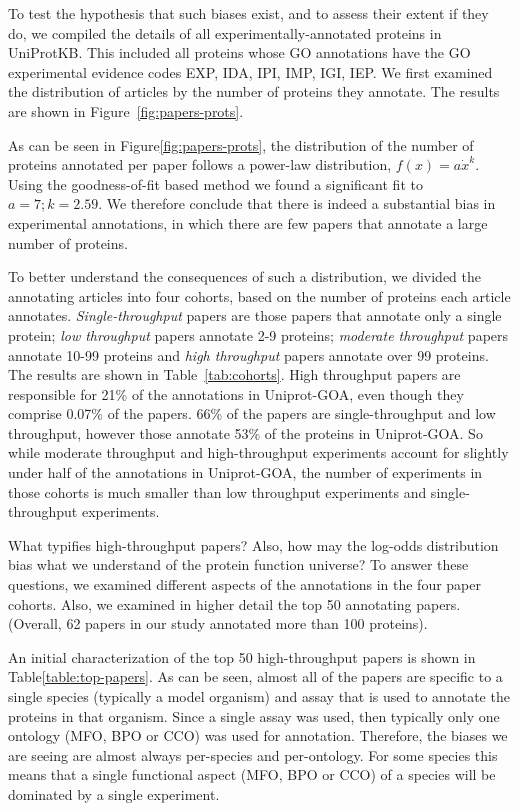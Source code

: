 \documentclass[10pt]{article}
\begin{document}
To test the hypothesis that such biases exist, and to assess their extent if they
do, we compiled the details of all experimentally-annotated
proteins in UniProtKB. This included all proteins whose GO annotations have
the GO experimental evidence codes EXP, IDA, IPI, IMP, IGI, IEP. We first examined
the distribution of articles by the number of proteins they annotate. The results
are shown in Figure~\ref{fig:papers-prots}. 

As can be seen in Figure\ref{fig:papers-prots}, the distribution of the number of proteins
annotated per paper follows a power-law distribution, $f(x)=a\dot x^k$. 
Using the goodness-of-fit based
method we found a significant fit to $a=7; k=2.59$. 
We therefore conclude that there is indeed a substantial bias in
experimental annotations, in which there are few papers that annotate a large
number of proteins.

To better understand the consequences of such a distribution, we divided the annotating
articles into four cohorts, based on the number of proteins each article annotates.
\textit{Single-throughput} papers are those papers that annotate only a single protein;
\textit{low throughput} papers annotate 2-9 proteins; \textit{moderate throughput} papers
annotate 10-99 proteins and \textit{high throughput} papers annotate over 99 proteins. The
results are shown in Table~\ref{tab:cohorts}. High throughput papers are responsible for
21\% of the annotations in Uniprot-GOA, even though they comprise 0.07\% of the papers. 66\%
of the papers are single-throughput and low throughput, however those annotate 53\% of the
proteins in Uniprot-GOA. So while moderate throughput and high-throughput experiments
account for slightly under half of the annotations in Uniprot-GOA, the number of experiments
in those cohorts is much smaller than low throughput experiments and single-throughput
experiments. 

What typifies high-throughput papers? Also, how may the log-odds distribution bias what we
understand of the protein function universe? To answer these questions, we examined
different aspects of the annotations in the four paper cohorts. Also, we examined in higher
detail the top 50 annotating papers. (Overall, 62 papers in our study annotated more than
100 proteins). 

An initial characterization of the top 50 high-throughput papers is shown in
Table\ref{table:top-papers}.  As can be seen, almost all of the papers are specific to a
single species (typically a model organism) and assay that is used to annotate the proteins
in that organism.  Since a single assay was used, then typically only one ontology (MFO, BPO
or CCO) was used for annotation. Therefore, the biases we are seeing are almost always
per-species and per-ontology. For some species this means that a single functional aspect
(MFO, BPO or CCO) of a species will be dominated by a single experiment.
\end{document}
